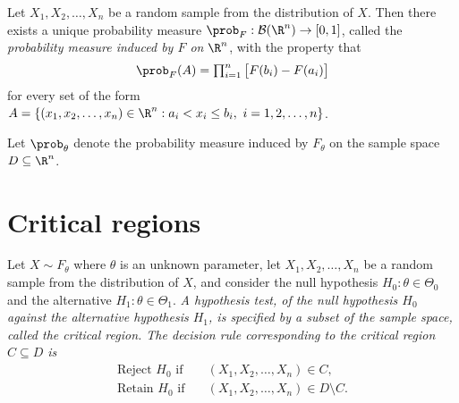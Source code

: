 Let $X_1,X_2,\ldots,X_n$ be a random sample from the distribution of $X$. Then there exists a unique probability measure $\prob_F:\mathcal{B}(\R^n)\to[0,1]$, called the \emph{probability measure induced by $F$ on $\R^n$}, with the property that
\[
\prob_F(A) = \textstyle\prod_{i=1}^n \big[F(b_i)-F(a_i)\big]
\]
for every set of the form $A=\{(x_1,x_2,\ldots,x_n)\in\R^n:a_i<x_i\leq b_i,\ i=1,2,\ldots,n\}$.


%
\begin{definition}
Let $\prob_{\theta}$ denote the probability measure induced by $F_\theta$ on the sample space $D\subseteq \R^n$.
\end{definition}

\section{Critical regions}

\begin{definition}
Let $X\sim F_{\theta}$ where $\theta$ is an unknown parameter, let $X_1,X_2,\ldots,X_n$ be a random sample from the distribution of $X$, and consider the null hypothesis $H_0:\theta\in\Theta_0$ and the alternative $H_1:\theta\in\Theta_1$.
\ben
\it A \emph{hypothesis test}, of the null hypothesis $H_0$ against the alternative hypothesis $H_1$, is specified by a subset of the sample space, called the \emph{critical region}.
\it The \emph{decision rule} corresponding to the critical region $C\subseteq D$ is
\begin{align*}
\text{Reject $H_0$ if}\quad & (X_1,X_2,\ldots,X_n)\in C, \\
\text{Retain $H_0$ if}\quad & (X_1,X_2,\ldots,X_n)\in D\setminus C.
\end{align*}
\een
\end{definition}



